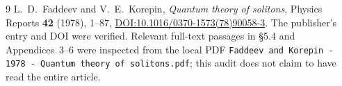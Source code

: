\documentclass[11pt]{article}
\begin{document}
\begin{thebibliography}{9}
 L.~D.~Faddeev and V.~E.~Korepin,
\emph{Quantum theory of solitons}, Physics Reports \textbf{42} (1978), 1--87,
\href{https://doi.org/10.1016/0370-1573(78)90058-3}{DOI:10.1016/0370-1573(78)90058-3}.
The publisher's entry and DOI were verified. Relevant full-text passages in
\S5.4 and Appendices~3--6 were inspected from the local PDF
\texttt{Faddeev and Korepin - 1978 - Quantum theory of solitons.pdf};
this audit does not claim to have read the entire article.
\end{thebibliography}
\end{document}
